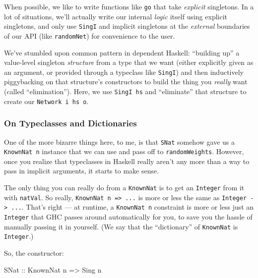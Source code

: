 \documentclass[]{article}
\newenvironment{Shaded}{}{}
\newcommand{\DataTypeTok}[1]{\textcolor[rgb]{0.56,0.13,0.00}{#1}}
\newcommand{\NormalTok}[1]{#1}
\newcommand{\OtherTok}[1]{\textcolor[rgb]{0.00,0.44,0.13}{#1}}
\begin{document}
When possible, we like to write functions like \texttt{go} that take
\emph{explicit} singletons. In a lot of situations, we'll actually write our
internal \emph{logic} itself using explicit singletons, and only use
\texttt{SingI} and implicit singletons at the \emph{external} boundaries of our
API (like \texttt{randomNet}) for convenience to the user.

We've stumbled upon common pattern in dependent Haskell: ``building up'' a
value-level singleton \emph{structure} from a type that we want (either
explicitly given as an argument, or provided through a typeclass like
\texttt{SingI}) and then inductively piggybacking on that structure's
constructors to build the thing you \emph{really} want (called ``elimination'').
Here, we use \texttt{SingI\ hs} and ``eliminate'' that structure to create our
\texttt{Network\ i\ hs\ o}.

\hypertarget{on-typeclasses-and-dictionaries}{%
\subsubsection{On Typeclasses and
Dictionaries}\label{on-typeclasses-and-dictionaries}}

One of the more bizarre things here, to me, is that \texttt{SNat} somehow gave
us a \texttt{KnownNat\ n} instance that we can use and pass off to
\texttt{randomWeights}. However, once you realize that typeclasses in Haskell
really aren't any more than a way to pass in implicit arguments, it starts to
make sense.

The only thing you can really do from a \texttt{KnownNat} is to get an
\texttt{Integer} from it with \texttt{natVal}. So really,
\texttt{KnownNat\ n\ =\textgreater{}\ ...} is more or less the same as
\texttt{Integer\ -\textgreater{}\ ...}. That's right --- at runtime, a
\texttt{KnownNat\ n} constraint is more or less just an \texttt{Integer} that
GHC passes around automatically for you, to save you the hassle of manually
passing it in yourself. (We say that the ``dictionary'' of \texttt{KnownNat} is
\texttt{Integer}.)

So, the constructor:

\begin{Shaded}
\begin{Highlighting}[]
\DataTypeTok{SNat}\OtherTok{ ::} \DataTypeTok{KnownNat}\NormalTok{ n }\OtherTok{=>} \DataTypeTok{Sing}\NormalTok{ n}
\end{Highlighting}
\end{Shaded}
\end{document}

